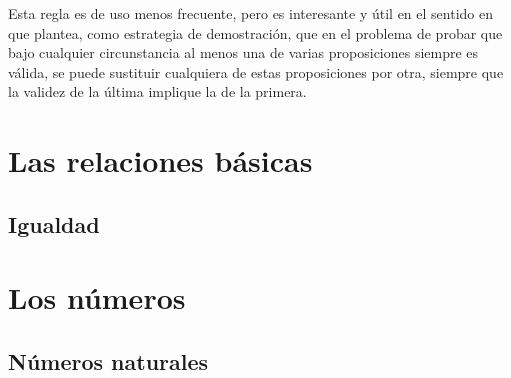 

Esta regla es de uso menos frecuente, pero es interesante y útil en el sentido en que plantea, como estrategia de demostración, que en el problema de probar que bajo cualquier circunstancia al menos una de varias proposiciones siempre es válida, se puede sustituir cualquiera de estas proposiciones por otra, siempre que la validez de la última implique la de la primera.

\section{Las relaciones básicas}
\subsection{Igualdad}




\section{Los números}
\subsection{Números naturales}



